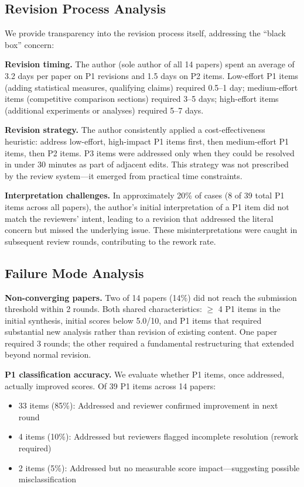 \subsection{Revision Process Analysis}

We provide transparency into the revision process itself, addressing the ``black box'' concern:

\textbf{Revision timing.} The author (sole author of all 14 papers) spent an average of 3.2 days per paper on P1 revisions and 1.5 days on P2 items. Low-effort P1 items (adding statistical measures, qualifying claims) required 0.5--1 day; medium-effort items (competitive comparison sections) required 3--5 days; high-effort items (additional experiments or analyses) required 5--7 days.

\textbf{Revision strategy.} The author consistently applied a cost-effectiveness heuristic: address low-effort, high-impact P1 items first, then medium-effort P1 items, then P2 items. P3 items were addressed only when they could be resolved in under 30 minutes as part of adjacent edits. This strategy was not prescribed by the review system---it emerged from practical time constraints.

\textbf{Interpretation challenges.} In approximately 20\% of cases (8 of 39 total P1 items across all papers), the author's initial interpretation of a P1 item did not match the reviewers' intent, leading to a revision that addressed the literal concern but missed the underlying issue. These misinterpretations were caught in subsequent review rounds, contributing to the rework rate.

\subsection{Failure Mode Analysis}

\textbf{Non-converging papers.} Two of 14 papers (14\%) did not reach the submission threshold within 2 rounds. Both shared characteristics: $\geq$ 4 P1 items in the initial synthesis, initial scores below 5.0/10, and P1 items that required substantial new analysis rather than revision of existing content. One paper required 3 rounds; the other required a fundamental restructuring that extended beyond normal revision.

\textbf{P1 classification accuracy.} We evaluate whether P1 items, once addressed, actually improved scores. Of 39 P1 items across 14 papers:
\begin{itemize}
    \item 33 items (85\%): Addressed and reviewer confirmed improvement in next round
    \item 4 items (10\%): Addressed but reviewers flagged incomplete resolution (rework required)
    \item 2 items (5\%): Addressed but no measurable score impact---suggesting possible misclassification
\end{itemize}

